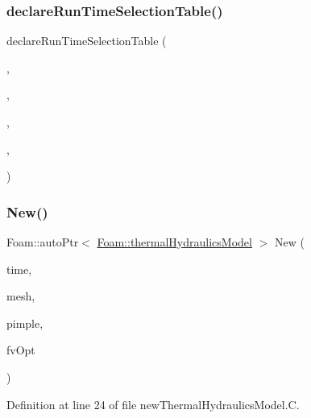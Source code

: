 \subsubsection{\texorpdfstring{declare\+Run\+Time\+Selection\+Table()}{declareRunTimeSelectionTable()}}
{\footnotesize\ttfamily declare\+Run\+Time\+Selection\+Table (\begin{DoxyParamCaption}\item[{auto\+Ptr}]{,  }\item[{\hyperlink{classFoam_1_1thermalHydraulicsModel}{thermal\+Hydraulics\+Model}}]{,  }\item[{thermal\+Hydraulics\+Models}]{,  }\item[{(Time \&time, fv\+Mesh \&\hyperlink{createMeshesPostProcess_8H_a8bb1e58291d2d2b653e024a4f4bffe38}{mesh}, \hyperlink{classFoam_1_1customPimpleControl}{custom\+Pimple\+Control} \&pimple, fv\+::options \&fv\+Opt)}]{,  }\item[{(time, \hyperlink{createMeshesPostProcess_8H_a8bb1e58291d2d2b653e024a4f4bffe38}{mesh}, pimple, fv\+Opt)}]{ }\end{DoxyParamCaption})}

\mbox{\label{classFoam_1_1thermalHydraulicsModel_abdb57d7a02afe89982026d582c0c87c2}} 
\subsubsection{\texorpdfstring{New()}{New()}}
{\footnotesize\ttfamily Foam\+::auto\+Ptr$<$ \hyperlink{classFoam_1_1thermalHydraulicsModel}{Foam\+::thermal\+Hydraulics\+Model} $>$ New (\begin{DoxyParamCaption}\item[{Time \&}]{time,  }\item[{fv\+Mesh \&}]{mesh,  }\item[{\hyperlink{classFoam_1_1customPimpleControl}{custom\+Pimple\+Control} \&}]{pimple,  }\item[{fv\+::options \&}]{fv\+Opt }\end{DoxyParamCaption})\hspace{0.3cm}{\ttfamily [static]}}



Definition at line 24 of file new\+Thermal\+Hydraulics\+Model.\+C.



